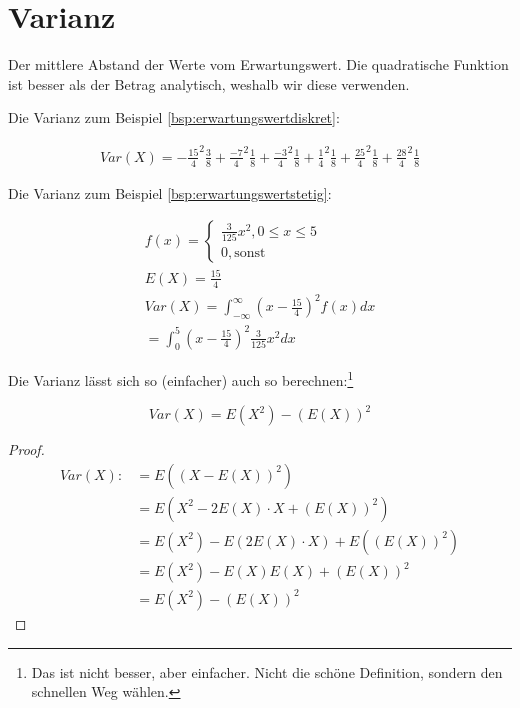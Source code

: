 \documentclass{tufte-handout}
\theoremstyle{own}
\begin{document}
\section{Varianz}

Der mittlere Abstand der Werte vom Erwartungswert. Die quadratische Funktion
ist besser als der Betrag analytisch, weshalb wir diese verwenden.

Die Varianz zum Beispiel \autoref{bsp:erwartungswertdiskret}:

\begin{gather*}
Var(X) = - \frac{15}{4} ^2 \frac{3}{8} + \frac{-7}{4}^2 \frac{1}{8} + \frac{-3}{4}^2 \frac{1}{8} + \frac{1}{4}^2 \frac{1}{8} + \frac{25}{4}^2 \frac{1}{8} + \frac{28}{4}^2 \frac{1}{8}
\end{gather*}

Die Varianz zum Beispiel \ref{bsp:erwartungswertstetig}:

\begin{gather*}
	f(x) = \begin{cases} 
	\frac{3}{125}x^2, 0 \leq x \leq 5 \\
	0, \text{sonst}
	\end{cases} \\
	E(X) = \frac{15}{4} \\
	Var(X) = \int_{-\infty}^\infty (x - \frac{15}{4})^2 f(x) dx \\
	= \int_0^5 (x - \frac{15}{4})^2 \frac{3}{125} x^2 dx
\end{gather*}

Die Varianz lässt sich so (einfacher) auch so berechnen:\footnote{Das ist nicht besser, aber einfacher. Nicht die schöne Definition, sondern den schnellen Weg wählen.}

\begin{equation}
\label{var:einfach}
Var(X) = E(X^2) - (E(X))^2 
\end{equation}

\begin{proof}
\begin{align*}
Var(X) :&= E((X - E(X))^2) \\
&= E(X^2 - 2E(X) \cdot X  + (E(X))^2) \\
&= E(X^2) - E(2E(X)\cdot X) + E((E(X))^2) \\
&= E(X^2) - E(X)E(X) + (E(X))^2 \\
&= E(X^2) - (E(X))^2
\end{align*}
\end{proof}

\end{document}
